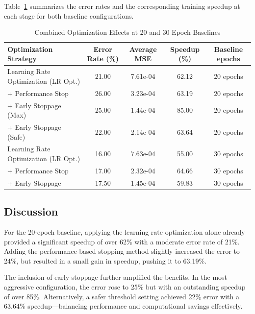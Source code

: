 Table~\ref{tab:combined_optimizations} summarizes the error rates and the corresponding training speedup at each stage for both baseline configurations.

\begin{table}[h!]
\centering
\begin{tabular}{|p{4.5cm}|c|c|c|c|}
\hline
\textbf{Optimization Strategy} & \textbf{Error Rate (\%)} & \textbf{Average MSE} & \textbf{Speedup (\%)} & \textbf{Baseline epochs} \\ \hline
Learning Rate Optimization (LR Opt.)         & 21.00  & 7.61e-04 & 62.12 & 20 epochs \\ \hline
+ Performance Stop                           & 26.00 & 3.23e-04 & 63.19 & 20 epochs \\ \hline
+ Early Stoppage (Max)                       & 25.00 & 1.44e-04  & 85.00 & 20 epochs \\ \hline
+ Early Stoppage (Safe)                      & 22.00 & 2.14e-04  & 63.64 & 20 epochs \\ \hline
\hline
Learning Rate Optimization (LR Opt.)         & 16.00 & 7.63e-04 & 55.00 & 30 epochs \\ \hline
+ Performance Stop                           & 17.00 & 2.32e-04 & 64.66 & 30 epochs \\ \hline
+ Early Stoppage                             & 17.50 & 1.45e-04  & 59.83 & 30 epochs \\ \hline
\end{tabular}
\caption{Combined Optimization Effects at 20 and 30 Epoch Baselines}
\label{tab:combined_optimizations}
\end{table}


\subsection*{Discussion}

For the 20-epoch baseline, applying the learning rate optimization alone already provided a significant speedup of over 62\% with a moderate error rate of 21\%. Adding the performance-based stopping method slightly increased the error to 24\%, but resulted in a small gain in speedup, pushing it to 63.19\%.

The inclusion of early stoppage further amplified the benefits. In the most aggressive configuration, the error rose to 25\% but with an outstanding speedup of over 85\%. Alternatively, a safer threshold setting achieved 22\% error with a 63.64\% speedup—balancing performance and computational savings effectively.

